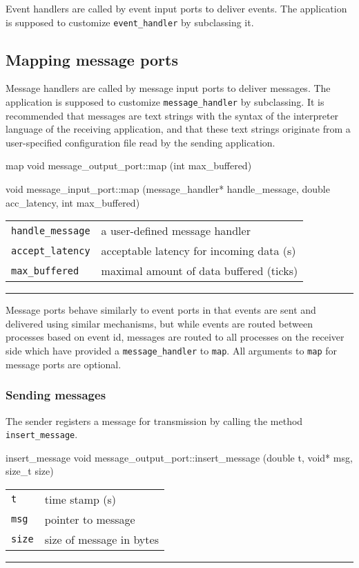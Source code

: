 \documentclass[a4paper]{report}
\makeatletter
\newenvironment{parameters}%
{\begin{tabular}{@{\hspace{2em}}lp{0.6\textwidth}}}%
{\end{tabular}\par\vspace{1mm}\par\hrule\par\vspace{5mm}}
\makeatother
\begin{document}
Event handlers are called by event input ports to deliver events.  The
application is supposed to customize \lstinline|event_handler| by
subclassing it.


\subsection{Mapping message ports}

Message handlers are called by message input ports to deliver
messages.  The application is supposed to customize
\lstinline|message_handler| by subclassing.  It is recommended that
messages are text strings with the syntax of the interpreter language
of the receiving application, and that these text strings originate
from a user-specified configuration file read by the sending
application.

\begin{head}{map}
  void message_output_port::map (int max_buffered)

  void message_input_port::map (message_handler* handle_message,
                                double acc_latency,
                                int max_buffered)
\end{head}
\begin{parameters}
  \lstinline|handle_message| & a user-defined message handler \\
  \lstinline|accept_latency| & acceptable latency for incoming data (s) \\
  \lstinline|max_buffered| & maximal amount of data buffered (ticks) \\
\end{parameters}

Message ports behave similarly to event ports in that events are sent
and delivered using similar mechanisms, but while events are routed
between processes based on event id, messages are routed to all
processes on the receiver side which have provided a
\lstinline|message_handler| to \lstinline|map|.  All arguments to
\lstinline|map| for message ports are optional.

\subsubsection{Sending messages}

The sender registers a message for transmission by calling the method
\lstinline|insert_message|.

\begin{head}{insert_message}
  void message_output_port::insert_message (double t, void* msg, size_t size)
\end{head}
\begin{parameters}
  \lstinline|t| & time stamp (s) \\
  \lstinline|msg| & pointer to message \\
  \lstinline|size| & size of message in bytes \\
\end{parameters}
\end{document}
